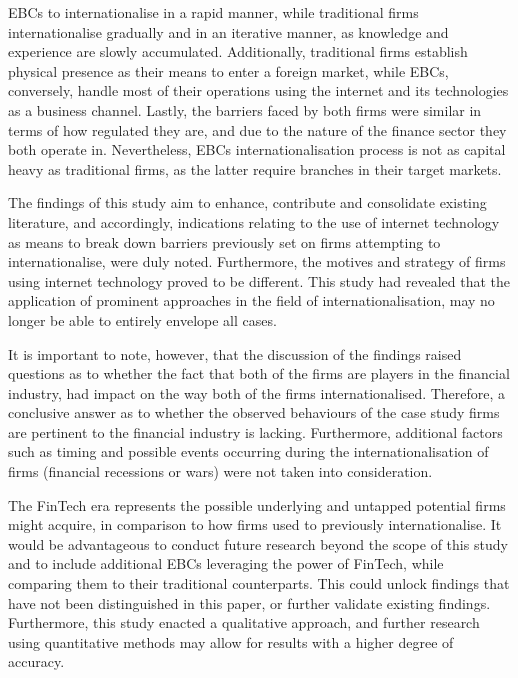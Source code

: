 \documentclass[11pt,a4paper]{article}
\begin{document}
{{{EBCs to internationalise in a rapid manner, while traditional firms internationalise gradually and in an iterative manner, as knowledge and experience are slowly accumulated. Additionally, traditional firms establish physical presence as their means to enter a foreign market, while EBCs, conversely, handle most of their operations using the internet and its technologies as a business channel. Lastly, the barriers faced by both firms were similar in terms of how regulated they are, and due to the nature of the finance sector they both operate in. Nevertheless, EBCs internationalisation process is not as capital heavy as traditional firms, as the latter require branches in their target markets. \par
The findings of this study aim to enhance, contribute and consolidate existing literature, and accordingly, indications relating to the use of internet technology as means to break down barriers previously set on firms attempting to internationalise, were duly noted. Furthermore, the motives and strategy of firms using internet technology proved to be different. This study had revealed that the application of prominent approaches in the field of internationalisation, may no longer be able to entirely envelope all cases. \par
It is important to note, however, that the discussion of the findings raised questions as to whether the fact that both of the firms are players in the financial industry, had impact on the way both of the firms internationalised. Therefore, a conclusive answer as to whether the observed behaviours of the case study firms are pertinent to the financial industry is lacking. Furthermore, additional factors such as timing and possible events occurring during the internationalisation of firms (financial recessions or wars) were not taken into consideration. \par
The FinTech era represents the possible underlying and untapped potential firms might acquire, in comparison to how firms used to previously internationalise. It would be advantageous to conduct future research beyond the scope of this study and to include additional EBCs leveraging the power of FinTech, while comparing them to their traditional counterparts. This could unlock findings that have not been distinguished in this paper, or further validate existing findings. Furthermore, this study enacted a qualitative approach, and further research using quantitative methods may allow for results with a higher degree of accuracy.




}}}
\end{document}

